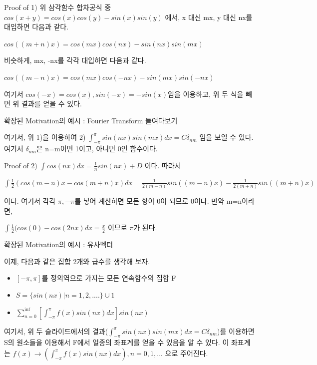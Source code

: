 \documentclass{beamer}
\begin{document}
\begin{frame}{Proof of 1)} 
위 삼각함수 합차공식 중 $cos(x+y) = cos(x)cos(y) - sin(x)sin(y)$ 에서, x 대신 mx, y 대신 nx를 대입하면 다음과 같다. 

$cos((m+n)x) = cos(mx)cos(nx) - sin(nx) sin(mx)$ 

비슷하게, mx, -nx를 각각 대입하면 다음과 같다. 

$cos((m-n)x) = cos(mx)cos(-nx) - sin(mx) sin(-nx)$

여기서 $cos(-x) = cos(x), sin(-x) = -sin(x)$임을 이용하고, 위 두 식을 빼면 위 결과를 얻을 수 있다. 

\end{frame}

\begin{frame}{확장된 Motivation의 예시 : Fourier Transform 들여다보기} 

여기서, 위 1)을 이용하여 2) $\int^{\pi}_{-\pi} sin(nx)sin(mx) dx = C\delta_{nm}$ 임을 보일 수 있다. 여기서 $\delta_{nm}$은 n=m이면 1이고, 아니면 0인 함수이다.

\end{frame}

\begin{frame}{Proof of 2)} 
$\int cos(nx) dx = \frac{1}{n} sin(nx) + D$ 이다. 따라서 

$\int \frac{1}{2} (cos(m-n)x - cos(m+n)x) dx = \frac{1}{2(m-n)} sin((m-n)x) - \frac{1}{2(m+n)} sin((m+n)x)$ 

이다. 여기서 각각 $\pi, -\pi$를 넣어 계산하면 모든 항이 0이 되므로 0이다. 만약 m=n이라면, 

$\int\frac{1}{2} (cos(0) - cos(2nx) dx = \frac{x}{2}$ 이므로 $\pi$가 된다. 

\end{frame}

\begin{frame}{확장된 Motivation의 예시 : 유사벡터} 

이제, 다음과 같은 집합 2개와 급수를 생각해 보자. 

\begin{itemize} 
\item $[-\pi, \pi]$를 정의역으로 가지는 모든 연속함수의 집합 F
\item $S = \{sin(nx)|n = 1,2,....\} \cup {1}$ 
\item $\sum^{\inf}_{n=0} [\int^{\pi}_{-\pi} f(x) sin(nx) dx] sin (nx) $
\end{itemize}

여기서, 위 두 슬라이드에서의 결과($\int^{\pi}_{-\pi} sin(nx)sin(mx) dx = C\delta_{nm}$)를 이용하면 S의 원소들을 이용해서 F에서 일종의 좌표계를 얻을 수 있음을 알 수 있다. 이 좌표계는 $f(x) \rightarrow (\int^{\pi}_{-\pi} f(x) sin(nx) dx), n=0,1,...$ 으로 주어진다. 
\end{frame}
\end{document}
